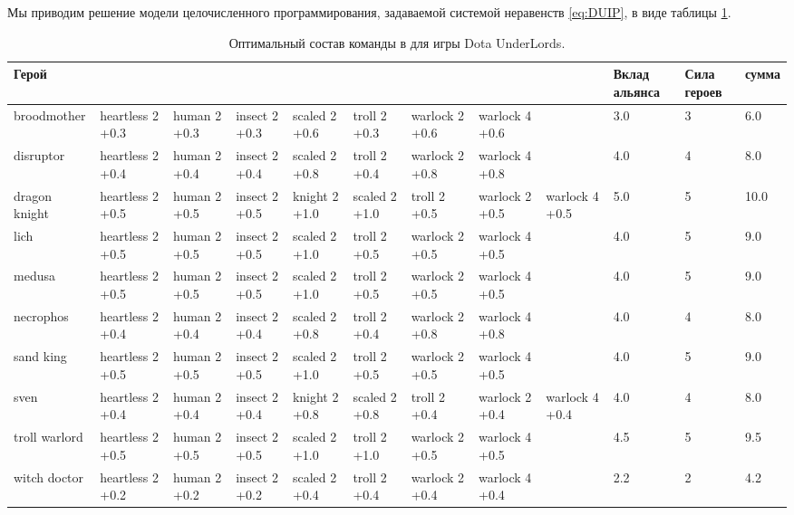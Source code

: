 \documentclass{article}
\begin{document}
Мы приводим решение модели целочисленного программирования, задаваемой системой неравенств  \eqref{eq:DUIP}, в виде таблицы \ref{table:solution}.

\begin{table}
\resizebox{16cm}{!} {
\begin{tabular}{l| *{8}{p{1.6cm}} | *{3}{ p{1cm}} }
{Герой} &                   &               &                &                &                &                  &                  &                  &  Вклад альянса &  Сила героев &   сумма \\
\midrule
broodmother   &  heartless 2 +0.3  &  human 2 +0.3  &  insect 2 +0.3  &  scaled 2 +0.6  &   troll 2 +0.3  &  warlock  2 +0.6  &  warlock  4 +0.6  &                   &                  3.0 &           3 &   6.0 \\
disruptor     &  heartless 2 +0.4  &  human 2 +0.4  &  insect 2 +0.4  &  scaled 2 +0.8  &   troll 2 +0.4  &  warlock  2 +0.8  &  warlock  4 +0.8  &                   &                  4.0 &           4 &   8.0 \\
dragon knight &  heartless 2 +0.5  &  human 2 +0.5  &  insect 2 +0.5  &  knight 2 +1.0  &  scaled 2 +1.0  &     troll 2 +0.5  &  warlock  2 +0.5  &  warlock  4 +0.5  &                  5.0 &           5 &  10.0 \\
lich          &  heartless 2 +0.5  &  human 2 +0.5  &  insect 2 +0.5  &  scaled 2 +1.0  &   troll 2 +0.5  &  warlock  2 +0.5  &  warlock  4 +0.5  &                   &                  4.0 &           5 &   9.0 \\
medusa        &  heartless 2 +0.5  &  human 2 +0.5  &  insect 2 +0.5  &  scaled 2 +1.0  &   troll 2 +0.5  &  warlock  2 +0.5  &  warlock  4 +0.5  &                   &                  4.0 &           5 &   9.0 \\
necrophos     &  heartless 2 +0.4  &  human 2 +0.4  &  insect 2 +0.4  &  scaled 2 +0.8  &   troll 2 +0.4  &  warlock  2 +0.8  &  warlock  4 +0.8  &                   &                  4.0 &           4 &   8.0 \\
sand king     &  heartless 2 +0.5  &  human 2 +0.5  &  insect 2 +0.5  &  scaled 2 +1.0  &   troll 2 +0.5  &  warlock  2 +0.5  &  warlock  4 +0.5  &                   &                  4.0 &           5 &   9.0 \\
sven          &  heartless 2 +0.4  &  human 2 +0.4  &  insect 2 +0.4  &  knight 2 +0.8  &  scaled 2 +0.8  &     troll 2 +0.4  &  warlock  2 +0.4  &  warlock  4 +0.4  &                  4.0 &           4 &   8.0 \\
troll warlord &  heartless 2 +0.5  &  human 2 +0.5  &  insect 2 +0.5  &  scaled 2 +1.0  &   troll 2 +1.0  &  warlock  2 +0.5  &  warlock  4 +0.5  &                   &                  4.5 &           5 &   9.5 \\
witch doctor  &  heartless 2 +0.2  &  human 2 +0.2  &  insect 2 +0.2  &  scaled 2 +0.4  &   troll 2 +0.4  &  warlock  2 +0.4  &  warlock  4 +0.4  &                   &                  2.2 &           2 &   4.2 \\
\bottomrule
\end{tabular}
}
\caption{Оптимальный состав команды в для игры Dota UnderLords. }
\label{table:solution}
\end{table}
\end{document}
